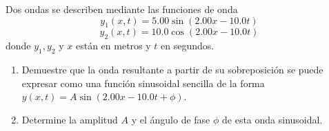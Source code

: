 \item Dos ondas se describen mediante las funciones de onda
$$ y_1(x, t) = 5.00 \sin (2.00x - 10.0t) $$
$$ y_2(x, t) = 10.0 \cos (2.00x - 10.0t) $$
donde $y_1, y_2$ y $x$ están en metros y $t$ en segundos.
\begin{enumerate}
    \item Demuestre que la onda resultante a partir de su sobreposición se puede expresar como una función sinusoidal sencilla de la forma $y(x, t) = A \sin(2.00x - 10.0t + \phi)$.
    \item Determine la amplitud $A$ y el ángulo de fase $\phi$ de esta onda sinusoidal.
\end{enumerate}